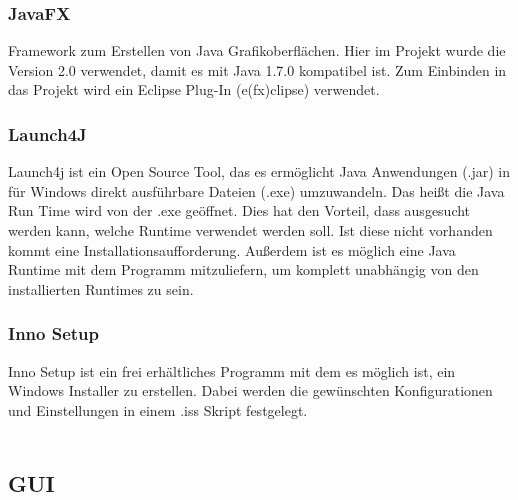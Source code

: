 \documentclass{article}
\begin{document}
		\subsubsection{JavaFX}
			Framework zum Erstellen von Java Grafikoberflächen. Hier im Projekt wurde die Version 2.0 verwendet, damit es mit Java 1.7.0 kompatibel ist. Zum Einbinden in das Projekt wird ein Eclipse Plug-In (e(fx)clipse) verwendet.
		\subsubsection{Launch4J}
			Launch4j ist ein Open Source Tool, das es ermöglicht Java Anwendungen (.jar) in für Windows direkt ausführbare Dateien (.exe) umzuwandeln. Das heißt die Java Run Time wird von der .exe geöffnet. Dies hat den Vorteil, dass ausgesucht werden kann, welche Runtime verwendet werden soll. Ist diese nicht vorhanden kommt eine Installationsaufforderung. Außerdem ist es möglich eine Java Runtime mit dem Programm mitzuliefern, um komplett unabhängig von den installierten Runtimes zu sein.
		\subsubsection{Inno Setup}
			Inno Setup ist ein frei erhältliches Programm mit dem es möglich ist, ein Windows Installer zu erstellen. Dabei werden die gewünschten Konfigurationen und Einstellungen in einem .iss Skript festgelegt.\\\\
	\subsection{GUI}
	
\end{document}

